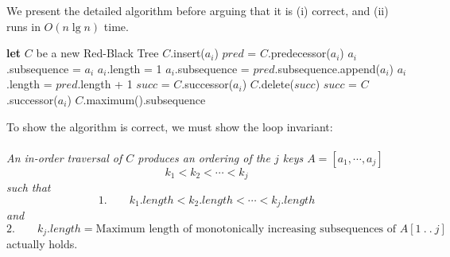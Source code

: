 \documentclass[paper=a4, fontsize=11pt]{scrartcl} %
\numberwithin{equation}{section} %
\numberwithin{figure}{section} %
\numberwithin{table}{section} %
\begin{document}
We present the detailed algorithm before arguing that it is (i) correct, and (ii) runs in $O(n \lg n)$ time.

\begin{algorithmic}[1]
\State \textbf{let} $C$ be a new Red-Black Tree
		\State $C$.insert($a_i$)
	\State $pred$ = $C$.predecessor($a_i$)
		\State $a_i$.subsequence = $a_i$
		\State $a_i$.length = 1
	\Else
		\State $a_i$.subsequence = $pred$.subsequence.append($a_i$)
		\State $a_i$.length = $pred$.length + 1
	\EndIf
	\State $succ$ = $C$.successor($a_i$)
		\State $C$.delete($succ$)
		\State $succ$ = $C$.successor($a_i$)
	\EndWhile
	\EndIf
\EndFor
\State \Return $C$.maximum().subsequence
\EndFunction
\end{algorithmic}

To show the algorithm is correct, we must show the loop invariant:\\ \\
\emph{An in-order traversal of $C$ produces an ordering of the $j$ keys $A = [a_1, \cdots, a_j]$}
\[k_1 < k_2 < \cdots < k_j\]
\emph{such that}
\[1. \qquad{} k_1.length < k_2.length < \cdots < k_j.length\]
\emph{and}
\[2. \qquad{} k_j.length = \textrm{Maximum length of monotonically increasing subsequences of } A[1~.~.~j]\]
actually holds.\\
\end{document}
